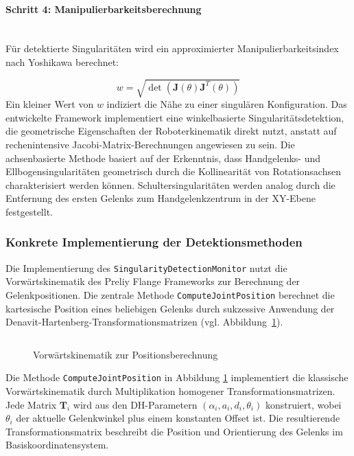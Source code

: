 \paragraph{Schritt 4: Manipulierbarkeitsberechnung}~\\
Für detektierte Singularitäten wird ein approximierter Manipulierbarkeitsindex
nach Yoshikawa berechnet:

\begin{equation}
  w = \sqrt{\det(\mathbf{J}(\theta)\mathbf{J}^T(\theta))}
  \label{eq:manipulability}
\end{equation}
\noindent
Ein kleiner Wert von $w$ indiziert die Nähe zu einer singulären Konfiguration.
Das entwickelte Framework implementiert eine winkelbasierte
Singularitätsdetektion, die geometrische Eigenschaften der Roboterkinematik
direkt nutzt, anstatt auf rechenintensive Jacobi-Matrix-Berechnungen angewiesen
zu sein. Die achsenbasierte Methode basiert auf der Erkenntnis, dass
Handgelenks- und Ellbogensingularitäten geometrisch durch die
Kollinearität von Rotationsachsen
charakterisiert werden können. Schultersingularitäten werden analog durch die
Entfernung des ersten Gelenks zum Handgelenkzentrum in der XY-Ebene
festgestellt.

\subsubsection{Konkrete Implementierung der Detektionsmethoden}
\label{sssec:Implementierung_Detektionsmethoden}
Die Implementierung des \texttt{SingularityDetectionMonitor} nutzt die
Vorwärtskinematik des Preliy Flange Frameworks zur Berechnung der
Gelenkpositionen. Die zentrale Methode \texttt{ComputeJointPosition} berechnet
die kartesische Position eines beliebigen Gelenks durch sukzessive Anwendung
der Denavit-Hartenberg-Transformationsmatrizen (vgl.
Abbildung~\ref{listing:forwardKinematic}).

\begin{figure}[H]
  \inputminted[fontsize=\footnotesize]{csharp}{code-snippets/CalculateJointPos.cs}
  \caption{Vorwärtskinematik zur Positionsberechnung}
  \label{listing:forwardKinematic}
\end{figure}

\noindent
Die Methode \texttt{ComputeJointPosition} in Abbildung
\ref{listing:forwardKinematic} implementiert die klassische
Vorwärtskinematik durch
Multiplikation homogener Transformationsmatrizen. Jede Matrix $\mathbf{T}_i$
wird aus den DH-Parametern $(\alpha_i, a_i, d_i, \theta_i)$ konstruiert, wobei
$\theta_i$ der aktuelle Gelenkwinkel plus einem konstanten Offset ist. Die
resultierende Transformationsmatrix beschreibt die Position und Orientierung des
Gelenks im Basiskoordinatensystem.\\

